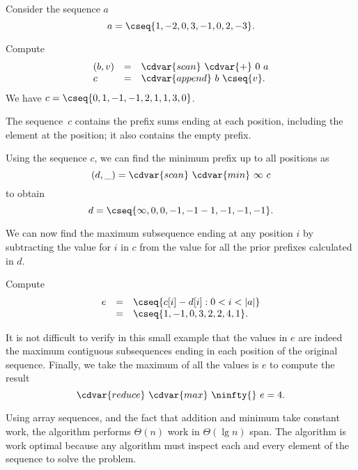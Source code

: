 \begin{flex}
\begin{example}
\label{ex:mcs:scan-based}
Consider the sequence $a$
\[
a = \cseq{1, -2, 0, 3, -1, 0, 2, -3}.
\]

Compute
\[
\begin{array}{lcl}
(b,v) & = & \cdvar{scan}~\cdvar{+}~0~a
\\
c  & = & \cdvar{append}~ b~ \cseq{v}.
\end{array}
\]
We have $c =  \cseq{0, 1, -1, -1, 2, 1, 1, 3, 0}$.

The sequence~$c$ contains the prefix sums ending at each position,
including the element at the position; it also contains the empty
prefix.


Using the sequence $c$, we can find the minimum prefix up to all
positions as
\[
(d,\_) = \cdvar{scan}~\cdvar{min}~\infty~c
\]
to obtain
\[
d = \cseq{\infty, 0, 0, -1, -1 -1, -1, -1, -1}.
\]

We can now find the maximum subsequence ending at any position $i$ by
subtracting the value for $i$ in $c$ from the value for all the prior
prefixes calculated in $d$.

Compute
\[
\begin{array}{lcl}
e & = & \cseq{c[i]-d[i]: 0 < i < |a|} 
\\
  & = & \cseq{1, -1, 0, 3, 2, 2, 4, 1}.
\end{array}
\]

It is not difficult to verify in this small example that the values in
$e$ are indeed the maximum contiguous subsequences ending in each
position of the original sequence.  Finally, we take the maximum of
all the values is $e$ to compute the result
\[
\cdvar{reduce}~\cdvar{max}~\ninfty{}~e = 4.
\]

\end{example}
\end{flex}

\begin{cluster}
\label{grp:grm:mcss::cost-of-the-algorithm}

\begin{gram}
\label{grm:mcss::cost-of-the-algorithm}
Using array sequences, and the fact that addition and minimum take
constant work, the algorithm performs $\Theta(n)$ work in $\Theta(\lg
n)$ span.  
The algorithm is work optimal because any algorithm must inspect each
and every element of the sequence to solve the \MCSS{} problem.

\end{gram}
\end{cluster}


